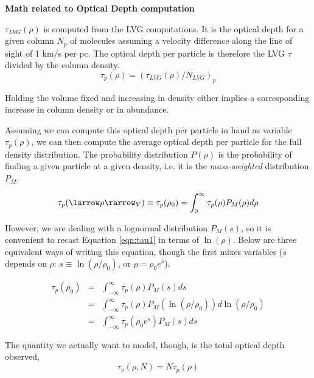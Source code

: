 


\textbf{Math related to Optical Depth computation}

$\tau_{LVG}(\rho)$ is computed from the LVG computations.  It is the optical
depth for a given column $N_p$ of \formaldehyde molecules assuming a velocity
difference along the line of sight of 1 km/s per pc.
The optical depth per particle is therefore the LVG $\tau$ divided by the column
density.
\begin{equation}
    \tau_p(\rho) = (\tau_{LVG}(\rho)/N_{LVG})_p
\end{equation}

Holding the volume fixed and increasing in density either implies a
corresponding increase in column density or in abundance.

Assuming we can compute this optical depth per particle in hand as variable
$\tau_p(\rho)$, we can then compute the average optical depth per particle for
the full density distribution.
The probability distribution $P(\rho)$ is the probability of finding a given
particle at a given density, i.e. it is the \emph{mass-weighted} distribution $P_M$.

\begin{equation}
    \label{eqn:tau1}
    \tau_p(\larrow\rho\rarrow_V) \equiv \tau_p(\rho_0) = \int_0^\infty \tau_p(\rho) P_M(\rho) d\rho
\end{equation}

However, we are dealing with a lognormal distribution $P_M(s)$, so it is
convenient to recast Equation \ref{eqn:tau1} in terms of $\ln(\rho)$.
Below are three equivalent ways of writing this equation, though the first
mixes variables ($s$ depends on $\rho$: $s\equiv \ln(\rho/\rho_0)$, or $\rho = \rho_0 e^s$).

\begin{eqnarray}
    \label{eqn:tau2}
    \tau_p(\rho_0) & = & \int_{-\infty}^\infty \tau_p(\rho) P_M(s) d s \\
                 & = & \int_{-\infty}^\infty \tau_p(\rho) P_M(\ln (\rho/\rho_0)) d\ln (\rho/\rho_0) \\
                 & = & \int_{-\infty}^\infty \tau_p(\rho_0 e^s) P_M(s) d s 
\end{eqnarray}

The quantity we actually want to model, though, is the total optical depth observed,
\begin{equation}
    \label{eqn:totaltau1}
    \tau_\nu(\rho,N) = N \tau_p(\rho)
\end{equation}

